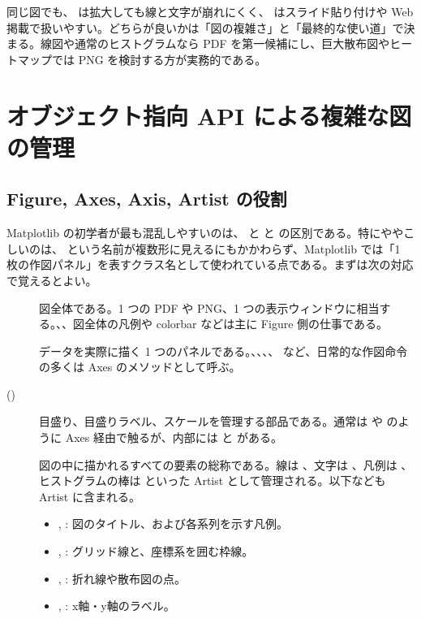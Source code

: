 同じ図でも、 は拡大しても線と文字が崩れにくく、 はスライド貼り付けや Web 掲載で扱いやすい。どちらが良いかは「図の複雑さ」と「最終的な使い道」で決まる。線図や通常のヒストグラムなら PDF を第一候補にし、巨大散布図やヒートマップでは PNG を検討する方が実務的である。


\section{オブジェクト指向 API による複雑な図の管理}\label{sec:matplotlob-object}

\subsection{Figure, Axes, Axis, Artist の役割}

Matplotlib の初学者が最も混乱しやすいのは、 と  と  の区別である。特にややこしいのは、 という名前が複数形に見えるにもかかわらず、Matplotlib では「1 枚の作図パネル」を表すクラス名として使われている点である。まずは次の対応で覚えるとよい。

\begin{description}
\item[] 図全体である。1 つの PDF や PNG、1 つの表示ウィンドウに相当する。、、図全体の凡例や colorbar などは主に Figure 側の仕事である。
\item[] データを実際に描く 1 つのパネルである。、、、、 など、日常的な作図命令の多くは Axes のメソッドとして呼ぶ。
\item[ ()] 目盛り、目盛りラベル、スケールを管理する部品である。通常は  や  のように Axes 経由で触るが、内部には  と  がある。
\item[] 図の中に描かれるすべての要素の総称である。線は 、文字は 、凡例は 、ヒストグラムの棒は  といった Artist として管理される。以下なども Artist に含まれる。
  \begin{itemize}
    \item {}, : 図のタイトル、および各系列を示す凡例。
    \item {}, : グリッド線と、座標系を囲む枠線。
    \item {}, : 折れ線や散布図の点。
    \item {}, : x軸・y軸のラベル。
  \end{itemize}
\end{description}

